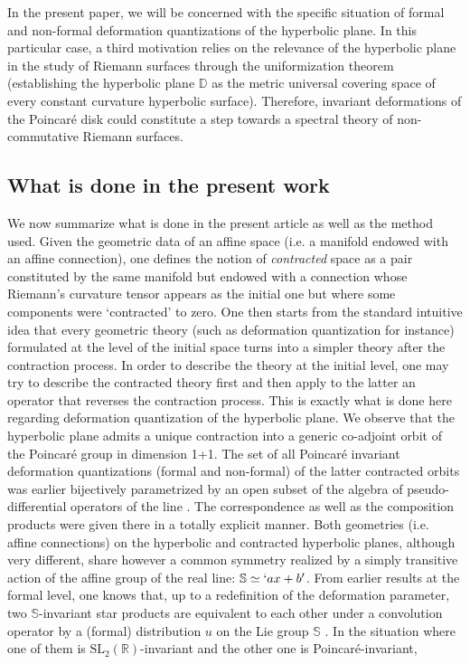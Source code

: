 \documentclass{article}
\newcommand{\DD}{\mathbb D}
\renewcommand{\SS}{\mathbb S}
\newcommand{\R}{\mathbb R}
\def \R{{\mathbb R}}
\begin{document}
\noindent In the present paper, we will be concerned with the specific situation of formal and non-formal deformation quantizations of  the hyperbolic plane. In this particular case, a third motivation relies on the relevance of the hyperbolic plane in the study of Riemann surfaces through the uniformization theorem (establishing the hyperbolic plane $\DD$  as the metric universal covering space of every constant curvature hyperbolic surface). Therefore, invariant deformations of the Poincar\'e disk could constitute a step towards a spectral theory of non-commutative Riemann surfaces.

\subsection{What is done in the present work}
We now summarize what is done in the present article as well as the method used. Given the geometric data
of an affine space (i.e. a manifold endowed with an affine connection), one defines the notion of {\sl contracted}
space as a pair constituted by the same manifold but endowed with a connection whose Riemann's curvature 
tensor appears as the initial one but where some components were `contracted' to zero. One then starts from the standard intuitive idea that every geometric theory (such as deformation quantization for instance) formulated at the 
level of the initial space turns into a simpler theory after the contraction process. In order to describe the theory at the initial level, one may try to describe the contracted theory first and then apply to the latter an operator that reverses the contraction process. This is exactly what is done here regarding deformation quantization of the hyperbolic plane. We observe that the hyperbolic plane admits a unique contraction into a generic co-adjoint orbit of the 
Poincar\'e group in dimension 1+1. The set of all Poincar\'e invariant deformation quantizations (formal and non-formal) of the latter contracted orbits was earlier bijectively  parametrized by an open subset of the algebra of pseudo-differential operators of the line  \cite{StarP, Bi07}. The correspondence as well as the composition
products were given there in a totally explicit manner. Both geometries (i.e. affine connections) on the hyperbolic
and contracted hyperbolic planes, although very different, share however a common symmetry realized by a
simply transitive action of the affine group of the real line: $\SS\simeq `ax+b'$.
From earlier results at the formal level, one knows that, up to a redefinition of the deformation parameter, two $\SS$-invariant star products are equivalent to each other under a convolution operator by a (formal) distribution $u$ on the Lie group $\SS$ \cite{BBG}. In the situation where one of them is $\mbox{SL}_2(\R)$-invariant and the other one is Poincar\'e-invariant, 
\end{document}
